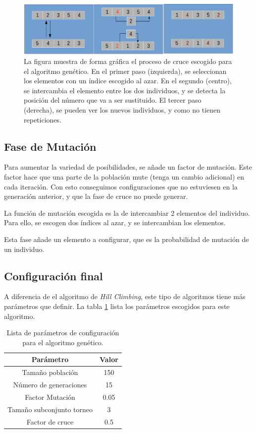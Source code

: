 \documentclass[10pt,a4paper]{article}
\begin{document}
\begin{figure}[h]
\includegraphics[scale=0.45]{gaCrossover.png} 
\caption{La figura muestra de forma gráfica el proceso de cruce escogido para el algoritmo genético. En el primer paso (izquierda), se seleccionan los elementos con un índice escogido al azar. En el segundo (centro), se intercambia el elemento entre los dos individuos, y se detecta la posición del número que va a ser sustituido. El tercer paso (derecha), se pueden ver los nuevos individuos, y como no tienen repeticiones.}
\label{fig:gaCrossover}
\end{figure}

\subsection{Fase de Mutación}
Para aumentar la variedad de posibilidades, se añade un factor de mutación. Este factor hace que una parte de la población mute (tenga un cambio adicional) en cada iteración. Con esto conseguimos configuraciones que no estuviesen en la generación anterior, y que la fase de cruce no puede generar.

La función de mutación escogida es la de intercambiar 2 elementos del individuo. Para ello, se escogen dos índices al azar, y se intercambian los elementos.

Esta fase añade un elemento a configurar, que es la probabilidad de mutación de un individuo.

\subsection{Configuración final}
A diferencia de el algoritmo de \textit{Hill Climbing}, este tipo de algoritmos tiene más parámetros que definir. La tabla \ref{tab:gaParameters} lista los parámetros escogidos para este algoritmo.

\begin{table}
\begin{center}
\begin{tabular}{|c||c|}
\hline
Parámetro & Valor \\
\hline \hline
Tamaño población & 150 \\
\hline
Número de generaciones & 15 \\
\hline
Factor Mutación & 0.05\\
\hline
Tamaño subconjunto torneo & 3\\
\hline
Factor de cruce & 0.5 \\
\hline
\end{tabular}
\end{center}
\caption{Lista de parámetros de configuración para el algoritmo genético.}
\label{tab:gaParameters}
\end{table}
\end{document}
